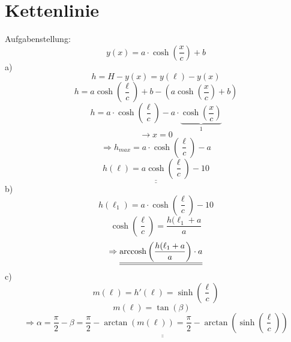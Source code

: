 \section{Kettenlinie}
Aufgabenstellung: 
\[y(x) = a \cdot \cosh\left(\frac{x}{c}\right) + b\]
a)\\
\[h = H - y(x) = y(\ell) - y(x)\]
\[h = a \cosh\left(\frac{\ell}{c}\right) + b - \left(a \cosh\left(\frac{x}{c}\right) + b\right)\]
\[h = a \cdot \cosh\left(\frac{\ell}{c}\right) - a \cdot \underbrace{\cosh\left(\frac{x}{c}\right)}_1\]
\[\rightarrow x = 0\]
\[\Rightarrow h_{max} = a \cdot \cosh\left(\frac{\ell}{c}\right)-a\]
\[\underline{\underline{h(\ell) = a \cosh\left(\frac{\ell}{c}\right) - 10}}\]
b)
\[h(\ell_1) =a \cdot \cosh\left(\frac{\ell}{c}\right) - 10\]
\[\cosh\left(\frac{\ell}{c}\right) = \frac{h(\ell_1 + a}{a}\]
\[\Rightarrow \underline{\underline{\operatorname{arccosh}\left(\frac{h(\ell_1 + a}{a}\right) \cdot a}}\]
c)
\[m(\ell) = h'(\ell) = \sinh\left(\frac{\ell}{c}\right)\]
\[m(\ell) = \tan(\beta) \quad\]
\[\Rightarrow \underline{\underline{\alpha = \frac{\pi}{2} - \beta = \frac{\pi}{2} - \arctan(m(\ell)) = \frac{\pi}{2} - \arctan\left(\sinh\left(\frac{\ell}{c}\right)\right)}}\]
